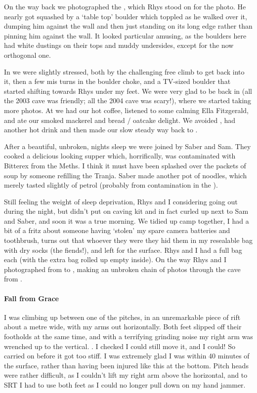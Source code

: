 On the way back we photographed the , which Rhys stood on for the photo. He nearly got squashed by a `table top' boulder which toppled as he walked over it, dumping him against the wall and then just standing on its long edge rather than pinning him against the wall. It looked particular amusing, as the boulders here had white dustings on their tops and muddy undersides, except for the now orthogonal one.


In  we were slightly stressed, both by the challenging free climb to get back into it, then a few mis turns in the boulder choke, and a TV-sized boulder that started shifting towards Rhys under my feet. We were very glad to be back in  (all the 2003 cave was friendly; all the 2004 cave was scary!), where we started taking more photos.
At  we had our hot coffee, listened to some calming Ella Fitzgerald, and ate our smoked mackerel and bread / oatcake delight. We avoided , had another hot drink and then made our slow steady way back to .

After a beautiful, unbroken, nights sleep we were joined by Saber and Sam. They cooked a delicious looking supper which, horrifically, was contaminated with Bitterex from the Meths. I think it must have been splashed over the packets of soup by someone refilling the Tranja. Saber made another pot of noodles, which merely tasted slightly of petrol (probably from contamination in the ).

Still feeling the weight of sleep deprivation, Rhys and I considering going out during the night, but didn't put on caving kit and in fact curled up next to Sam and Saber, and soon it was a true morning. We tidied up camp together, I had a bit of a fritz about someone having `stolen' my spare camera batteries and toothbrush, turns out that whoever they were they hid them in my resealable bag with dry socks (the fiends!), and left for the surface. Rhys and I had a full bag each (with the extra bag rolled up empty inside). On the way Rhys and I photographed from  to , making an unbroken chain of photos through the cave from .


\paragraph{Fall from Grace}
I was climbing up between one of the  pitches, in an unremarkable piece of rift about a metre wide, with my arms out horizontally. Both feet slipped off their footholds at the same time, and with a terrifying grinding noise my right arm was wrenched up to the vertical. . I checked I could still move it, and I could! So carried on before it got too stiff. I was extremely glad I was within 40 minutes of the surface, rather than having been injured like this at the bottom. Pitch heads were rather difficult, as I couldn't lift my right arm above the horizontal, and to SRT I had to use both feet as I could no longer pull down on my hand jammer.


